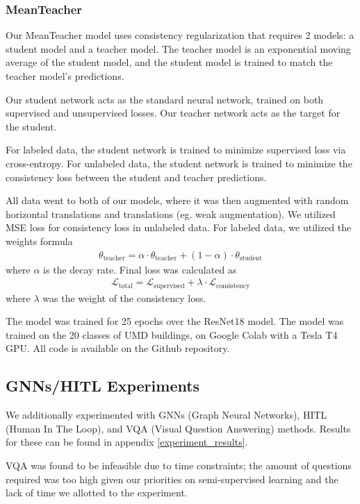 \documentclass{article}
\begin{document}
\subsubsection{MeanTeacher}

Our MeanTeacher model uses consistency regularization that requires 2 models: a student model and a teacher model. The teacher model is an exponential moving average of the student model, and the student model is trained to match the teacher model’s predictions.

Our student network acts as the standard neural network, trained on both supervised and unsupervised losses. Our teacher network acts as the target for the student. 

For labeled data, the student network is trained to minimize supervised loss via cross-entropy. For unlabeled data, the student network is trained to minimize the consistency loss between the student and teacher predictions.

All data went to both of our models, where it was then augmented with random horizontal translations and translations (eg. weak augmentation). We utilized MSE loss for consistency loss in unlabeled data. For labeled data, we utilized the weights formula \begin{align*}
    \theta_{\text{teacher}}=\alpha \cdot\theta_{\text{teacher}}+(1-\alpha)\cdot\theta_{\text{student}}
\end{align*} where $\alpha$ is the decay rate. Final loss was calculated as \begin{align*}
    \mathcal{L}_{\text{total}}=\mathcal{L}_{\text{supervised}}+\lambda\cdot\mathcal{L}_{\text{consistency}}
\end{align*}where $\lambda$ was the weight of the consistency loss.

The model was trained for 25 epochs over the ResNet18 model. The model was trained on the 20 classes of UMD buildings, on Google Colab with a Tesla T4 GPU. All code is available on the Github repository.

\subsection{GNNs/HITL Experiments}

We additionally experimented with GNNs (Graph Neural Networks), HITL (Human In The Loop), and VQA (Visual Question Answering) methods. Results for these can be found in appendix \ref{experiment_results}.

VQA was found to be infeasible due to time constraints; the amount of questions required was too high given our priorities on semi-supervised learning and the lack of time we allotted to the experiment.
\end{document}
